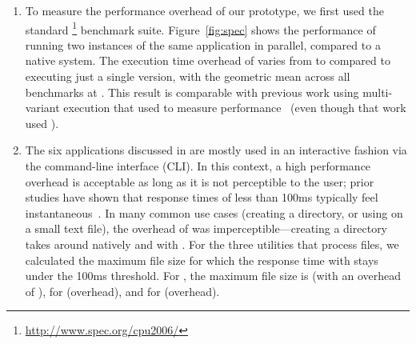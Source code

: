 \begin{enumerate}
\item[\speczerosix] To measure the performance overhead of our prototype, we
  first used the standard
  \speczerosix\footnote{\url{http://www.spec.org/cpu2006/}} benchmark suite.
  Figure~\ref{fig:spec} shows the performance of \mx running two instances of
  the same application in parallel, compared to a native system. The execution
  time overhead of \mx varies from \minOverSPEC to \maxOverSPEC compared to
  executing just a single version, with the geometric mean across all
  \numSPECbench benchmarks at \avgOverSPEC. This result is comparable with
  previous work using multi-variant execution that used \speccpu to measure
  performance~\cite{orchestra09} (even though that work used \speczerozero).


\item[\gnu~\coreutils] The six \coreutils applications discussed in
   are mostly used in an interactive fashion via the
  command-line interface (CLI). In this context, a high performance
  overhead is acceptable as long as it is not perceptible to the user; prior
  studies have shown that response times of less than 100ms typically feel
  instantaneous~\cite{card:human_proc}. In many common use cases (\eg creating
  a directory, or using \cut on a small text file), the overhead of \mx was
  imperceptible---\eg creating a directory takes around \avgMkdirNative
  natively and \avgMkdirMx with \mx. For the three utilities that process
  files, we calculated the maximum file size for which the response time with
  \mx stays under the 100ms threshold.  For \cut, the maximum file size is
  \cutCutoffSize (with an overhead of \cutCutoffOver), for \mdsum
  \mdsumCutoffSize (\mdsumCutoffOver overhead), and for \shasum
  \shasumCutoffSize (\shasumCutoffOver overhead).


\end{enumerate}
